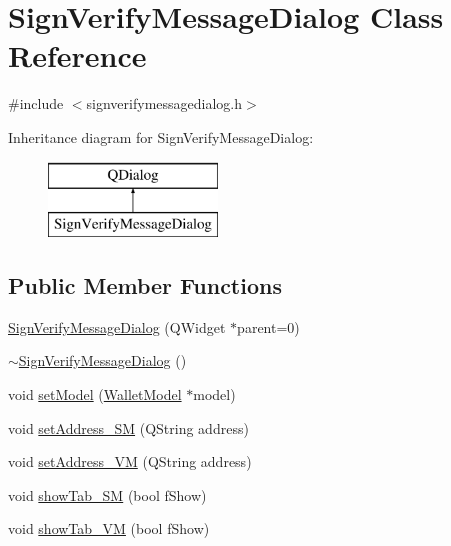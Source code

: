 \hypertarget{class_sign_verify_message_dialog}{}\section{Sign\+Verify\+Message\+Dialog Class Reference}
\label{class_sign_verify_message_dialog}


{\ttfamily \#include $<$signverifymessagedialog.\+h$>$}

Inheritance diagram for Sign\+Verify\+Message\+Dialog\+:\begin{figure}[H]
\begin{center}
\leavevmode
\includegraphics[height=2.000000cm]{class_sign_verify_message_dialog}
\end{center}
\end{figure}
\subsection*{Public Member Functions}
\begin{DoxyCompactItemize}
\item 
\hyperlink{class_sign_verify_message_dialog_a7f1018cc43f5c43b8d3131ac4922716b}{Sign\+Verify\+Message\+Dialog} (Q\+Widget $\ast$parent=0)
\item 
\hyperlink{class_sign_verify_message_dialog_a4b99c2759512cf2133f29cc497c5c179}{$\sim$\+Sign\+Verify\+Message\+Dialog} ()
\item 
void \hyperlink{class_sign_verify_message_dialog_ad1479ca27c2fd7d6fd1160c41660ea84}{set\+Model} (\hyperlink{class_wallet_model}{Wallet\+Model} $\ast$model)
\item 
void \hyperlink{class_sign_verify_message_dialog_ad676f0afab861bc083670316e9439c65}{set\+Address\+\_\+\+S\+M} (Q\+String address)
\item 
void \hyperlink{class_sign_verify_message_dialog_a24d7ebbcbc3f0889b64cac88788fce01}{set\+Address\+\_\+\+V\+M} (Q\+String address)
\item 
void \hyperlink{class_sign_verify_message_dialog_a3b06ea85a2640312e0074d8dabce6416}{show\+Tab\+\_\+\+S\+M} (bool f\+Show)
\item 
void \hyperlink{class_sign_verify_message_dialog_a6db3c37d3f5a3c070daed2c731cc79d5}{show\+Tab\+\_\+\+V\+M} (bool f\+Show)
\end{DoxyCompactItemize}
